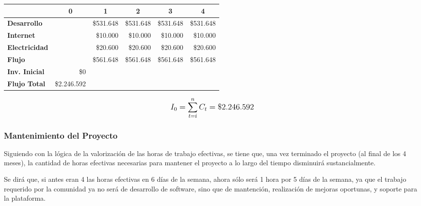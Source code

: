 \begin{center}
	\begin{tabular}{ | l | l | l | l | l | l | }
		\hline
		 & \multicolumn{1}{|c|}{\textbf{0}} & \multicolumn{1}{|c|}{\textbf{1}} & \multicolumn{1}{|c|}{\textbf{2}} & \multicolumn{1}{|c|}{\textbf{3}} & \multicolumn{1}{|c|}{\textbf{4}} \\
		\hline
		{\textbf{Desarrollo}} &  & \multicolumn{1}{|r|}{\$531.648} & \multicolumn{1}{|r|}{\$531.648} & \multicolumn{1}{|r|}{\$531.648} & \multicolumn{1}{|r|}{\$531.648} \\ \hline
		
		{\textbf{Internet}} &  & \multicolumn{1}{|r|}{\$10.000} & \multicolumn{1}{|r|}{\$10.000} & \multicolumn{1}{|r|}{\$10.000} & \multicolumn{1}{|r|}{\$10.000} \\ \hline
		
		{\textbf{Electricidad}} &  & \multicolumn{1}{|r|}{\$20.600} & \multicolumn{1}{|r|}{\$20.600} & \multicolumn{1}{|r|}{\$20.600} & \multicolumn{1}{|r|}{\$20.600} \\ \hline
		
		{\textbf{Flujo}} &  & \multicolumn{1}{|r|}{\$561.648} & \multicolumn{1}{|r|}{\$561.648} & \multicolumn{1}{|r|}{\$561.648} & \multicolumn{1}{|r|}{\$561.648} \\ \hline
		{\textbf{Inv. Inicial}}& \multicolumn{1}{|r|}{\$0} & & & & \\ \hline
		\textbf{Flujo Total} & \multicolumn{1}{|r|}{\$2.246.592} & & & & \\ \hline
	\end{tabular}
\end{center}

\[
\mathlarger{
	{I_0} = \sum\limits_{t=i}^{n}C_t = \$2.246.592
}
\]

\subsubsection{Mantenimiento del Proyecto}
Siguiendo con la lógica de la valorización de las horas de trabajo efectivas, se tiene que, una vez terminado el proyecto (al final de los 4 meses), la cantidad de horas efectivas necesarias para mantener el proyecto a lo largo del tiempo disminuirá sustancialmente.

Se dirá que, si antes eran 4 las horas efectivas en 6 días de la semana, ahora sólo será 1 hora por 5 días de la semana, ya que el trabajo requerido por la comunidad ya no será de desarrollo de software, sino que de mantención, realización de mejoras oportunas, y soporte para la plataforma.

